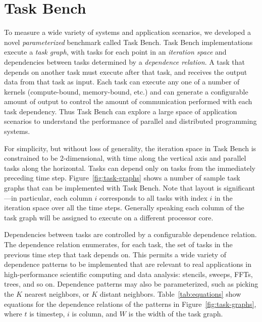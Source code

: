 \section{Task Bench}
\label{sec:task-bench}

To measure a wide variety of
systems and application scenarios, we developed a novel
\emph{parameterized} benchmark called Task Bench. Task Bench
implementations execute a \emph{task graph}, with tasks for each point
in an \emph{iteration space} and dependencies between tasks determined
by a \emph{dependence relation}. A task that depends on another task
must execute after that task, and receives the output data from that
task as input. Each task can execute any one of a
number of kernels (compute-bound, memory-bound, etc.) and can generate
a configurable amount of output to control the amount of communication
performed with each task dependency. Thus Task Bench can explore a large space of application scenarios to
understand the performance of parallel and
distributed programming systems.

For simplicity, but without loss of generality, the iteration space in
Task Bench is constrained to be 2-dimensional, with time along
the vertical axis and parallel tasks along the
horizontal. Tasks can depend only on tasks from the immediately
preceding time step. Figure~\ref{fig:task-graphs} shows a number of sample task
graphs that can be implemented with Task Bench. Note that layout is
significant---in particular, each column $i$ corresponds to all tasks
with index $i$ in the iteration space over all the time
steps. Generally speaking each column of the task graph will be
assigned to execute on a different processor core.

Dependencies between tasks are controlled by a configurable dependence
relation. The
dependence relation enumerates, for each task, the set of tasks in the
previous time step that task depends on. This permits a wide variety
of dependence patterns to be implemented that are relevant to real
applications in high-performance scientific computing and data analysis: stencils,
sweeps, FFTs, trees, and so on. Dependence patterns may also be
parameterized, such as picking the $K$ nearest neighbors, or $K$
distant neighbors. Table~\ref{tab:equations} show equations for the
dependence relations of the patterns in Figure~\ref{fig:task-graphs},
where $t$ is timestep, $i$ is column, and $W$ is the width of the task
graph.




